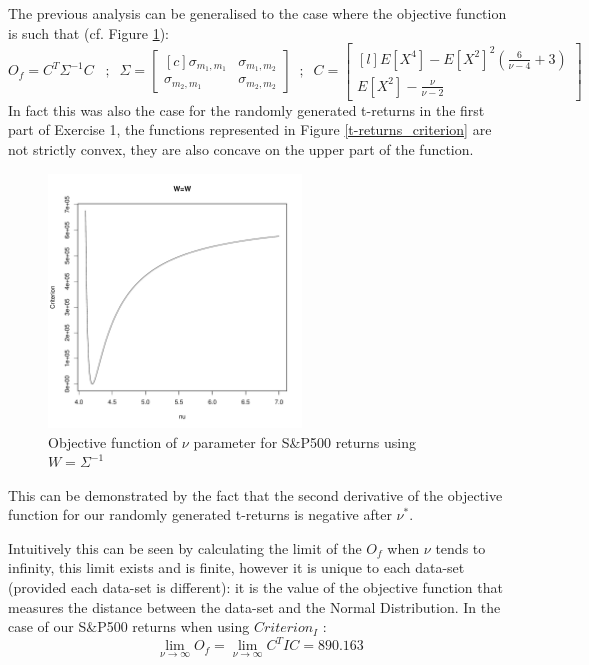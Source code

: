 The previous analysis can be generalised to the case where the objective function is such that (cf. Figure \ref{ConcavitySPW}):
\begin{equation*}
    O_f = C^T \Sigma^{-1} C \; \; \; ; \; \;
        \Sigma=
    \begin{bmatrix}[c]
        \sigma_{m_1,m_1}    & \sigma_{m_1,m_2} \\
        \sigma_{m_2,m_1}    & \sigma_{m_2,m_2}
    \end{bmatrix}
    \;\; ; \; \; C = 
    \begin{bmatrix}[l]
        E[X^4]-E[X^2]^2(\frac{6}{\nu-4}+3)  \\
        E[X^2]-\frac{\nu}{\nu-2}
    \end{bmatrix}
\end{equation*}
In fact this was also the case for the randomly generated t-returns in the first part of Exercise 1, the functions represented in Figure \ref{t-returns_criterion} are not strictly convex, they are also concave on the upper part of the function.
\begin{figure}
    \centering
    \includegraphics[width=0.6\textwidth]{ConcavityS&PW.pdf}
    \caption{Objective function of $\nu$ parameter for S\&P500 returns using $W=\Sigma^{-1}$}
    \label{ConcavitySPW}
\end{figure}
This can be demonstrated by the fact that the second derivative of the objective function for our randomly generated t-returns is negative after $\nu^*$.
\smallskip\par
Intuitively this can be seen by calculating the limit of the $O_f$ when $\nu$ tends to infinity, this limit exists and is finite, however it is unique to each data-set (provided each data-set is different): it is the value of the objective function that measures the distance between the data-set and the Normal Distribution. In the case of our S\&P500 returns when using $Criterion_I$ :
\begin{equation*}
    \lim_{\nu \to \infty}O_f = \lim_{\nu \to \infty}C^T I C = 890.163
\end{equation*}


